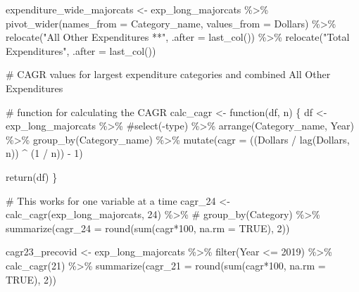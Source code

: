 \documentclass[
  letterpaper,
  DIV=11,
  numbers=noendperiod]{scrreport}
\newenvironment{Shaded}{\begin{snugshade}}{\end{snugshade}}
\newcommand{\AttributeTok}[1]{\textcolor[rgb]{0.40,0.45,0.13}{#1}}
\newcommand{\CommentTok}[1]{\textcolor[rgb]{0.37,0.37,0.37}{#1}}
\newcommand{\ConstantTok}[1]{\textcolor[rgb]{0.56,0.35,0.01}{#1}}
\newcommand{\ControlFlowTok}[1]{\textcolor[rgb]{0.00,0.23,0.31}{#1}}
\newcommand{\DecValTok}[1]{\textcolor[rgb]{0.68,0.00,0.00}{#1}}
\newcommand{\FunctionTok}[1]{\textcolor[rgb]{0.28,0.35,0.67}{#1}}
\newcommand{\NormalTok}[1]{\textcolor[rgb]{0.00,0.23,0.31}{#1}}
\newcommand{\OtherTok}[1]{\textcolor[rgb]{0.00,0.23,0.31}{#1}}
\newcommand{\SpecialCharTok}[1]{\textcolor[rgb]{0.37,0.37,0.37}{#1}}
\newcommand{\StringTok}[1]{\textcolor[rgb]{0.13,0.47,0.30}{#1}}
\begin{document}
\begin{Shaded}
\begin{Highlighting}[]
\NormalTok{expenditure\_wide\_majorcats }\OtherTok{\textless{}{-}}\NormalTok{ exp\_long\_majorcats }\SpecialCharTok{\%\textgreater{}\%} 
  \FunctionTok{pivot\_wider}\NormalTok{(}\AttributeTok{names\_from =}\NormalTok{ Category\_name, }
              \AttributeTok{values\_from =}\NormalTok{ Dollars) }\SpecialCharTok{\%\textgreater{}\%}
  \FunctionTok{relocate}\NormalTok{(}\StringTok{"All Other Expenditures **"}\NormalTok{, }\AttributeTok{.after =} \FunctionTok{last\_col}\NormalTok{()) }\SpecialCharTok{\%\textgreater{}\%}
  \FunctionTok{relocate}\NormalTok{(}\StringTok{"Total Expenditures"}\NormalTok{, }\AttributeTok{.after =}  \FunctionTok{last\_col}\NormalTok{())}


\CommentTok{\# CAGR values for largest expenditure categories and combined All Other Expenditures}

\CommentTok{\# function for calculating the CAGR}
\NormalTok{calc\_cagr }\OtherTok{\textless{}{-}} \ControlFlowTok{function}\NormalTok{(df, n) \{}
\NormalTok{  df }\OtherTok{\textless{}{-}}\NormalTok{ exp\_long\_majorcats }\SpecialCharTok{\%\textgreater{}\%}
    \CommentTok{\#select({-}type) \%\textgreater{}\%}
    \FunctionTok{arrange}\NormalTok{(Category\_name, Year) }\SpecialCharTok{\%\textgreater{}\%}
    \FunctionTok{group\_by}\NormalTok{(Category\_name) }\SpecialCharTok{\%\textgreater{}\%}
    \FunctionTok{mutate}\NormalTok{(}\AttributeTok{cagr =}\NormalTok{ ((}\StringTok{\textasciigrave{}}\AttributeTok{Dollars}\StringTok{\textasciigrave{}} \SpecialCharTok{/} \FunctionTok{lag}\NormalTok{(}\StringTok{\textasciigrave{}}\AttributeTok{Dollars}\StringTok{\textasciigrave{}}\NormalTok{, n)) }\SpecialCharTok{\^{}}\NormalTok{ (}\DecValTok{1} \SpecialCharTok{/}\NormalTok{ n)) }\SpecialCharTok{{-}} \DecValTok{1}\NormalTok{)}

  \FunctionTok{return}\NormalTok{(df)}
\NormalTok{\}}

\CommentTok{\# This works for one variable at a time}
\NormalTok{cagr\_24 }\OtherTok{\textless{}{-}} \FunctionTok{calc\_cagr}\NormalTok{(exp\_long\_majorcats, }\DecValTok{24}\NormalTok{) }\SpecialCharTok{\%\textgreater{}\%} 
  \CommentTok{\# group\_by(Category) \%\textgreater{}\%}
  \FunctionTok{summarize}\NormalTok{(}\AttributeTok{cagr\_24 =} \FunctionTok{round}\NormalTok{(}\FunctionTok{sum}\NormalTok{(cagr}\SpecialCharTok{*}\DecValTok{100}\NormalTok{, }\AttributeTok{na.rm =} \ConstantTok{TRUE}\NormalTok{), }\DecValTok{2}\NormalTok{))}

\NormalTok{cagr23\_precovid }\OtherTok{\textless{}{-}}\NormalTok{ exp\_long\_majorcats }\SpecialCharTok{\%\textgreater{}\%}
  \FunctionTok{filter}\NormalTok{(Year }\SpecialCharTok{\textless{}=} \DecValTok{2019}\NormalTok{) }\SpecialCharTok{\%\textgreater{}\%}
  \FunctionTok{calc\_cagr}\NormalTok{(}\DecValTok{21}\NormalTok{) }\SpecialCharTok{\%\textgreater{}\%} 
  \FunctionTok{summarize}\NormalTok{(}\AttributeTok{cagr\_21 =} \FunctionTok{round}\NormalTok{(}\FunctionTok{sum}\NormalTok{(cagr}\SpecialCharTok{*}\DecValTok{100}\NormalTok{, }\AttributeTok{na.rm =} \ConstantTok{TRUE}\NormalTok{), }\DecValTok{2}\NormalTok{))}




\end{Highlighting}
\end{Shaded}
\end{document}
